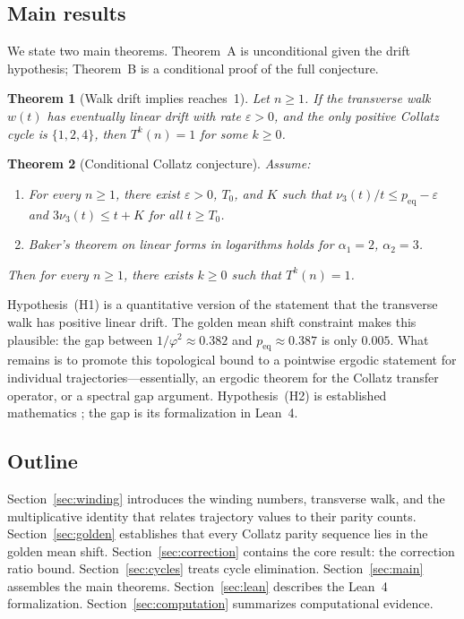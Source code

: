 \documentclass[manuscript]{aomart}
\theoremstyle{plain}
\newtheorem{theoremA}{Theorem}
\theoremstyle{definition}
\theoremstyle{remark}
\numberwithin{equation}{section}
\begin{document}
\subsection{Main results}

We state two main theorems.  Theorem~A is unconditional given the
drift hypothesis; Theorem~B is a conditional proof of the full
conjecture.

\begin{theoremA}[Walk drift implies reaches~1]\label{thm:A}
Let $n \ge 1$.  If the transverse walk $w(t)$ has eventually linear
drift with rate $\varepsilon > 0$, and the only positive Collatz
cycle is $\{1, 2, 4\}$, then $T^k(n) = 1$ for some $k \ge 0$.
\end{theoremA}

\begin{theoremA}[Conditional Collatz conjecture]\label{thm:B}
Assume:
\begin{enumerate}
  \item[\textup{(H1)}] For every $n \ge 1$, there exist
    $\varepsilon > 0$, $T_0$, and $K$ such that
    $\nu_3(t)/t \le p_{\mathrm{eq}} - \varepsilon$ and
    $3\nu_3(t) \le t + K$ for all $t \ge T_0$.
  \item[\textup{(H2)}] Baker's theorem on linear forms in logarithms
    holds for $\alpha_1 = 2$, $\alpha_2 = 3$.
\end{enumerate}
Then for every $n \ge 1$, there exists $k \ge 0$ such that
$T^k(n) = 1$.
\end{theoremA}

Hypothesis~(H1) is a quantitative version of the statement that the
transverse walk has positive linear drift.  The golden mean shift
constraint makes this plausible: the gap between
$1/\varphi^2 \approx 0.382$ and $p_{\mathrm{eq}} \approx 0.387$ is
only $0.005$.  What remains is to promote this topological bound to a
pointwise ergodic statement for individual trajectories---essentially,
an ergodic theorem for the Collatz transfer operator, or a spectral
gap argument.  Hypothesis~(H2) is established mathematics
\cite{Baker1975}; the gap is its formalization in Lean~4.

\subsection{Outline}

Section~\ref{sec:winding} introduces the winding numbers, transverse
walk, and the multiplicative identity that relates trajectory values
to their parity counts.  Section~\ref{sec:golden} establishes that
every Collatz parity sequence lies in the golden mean shift.
Section~\ref{sec:correction} contains the core result: the correction
ratio bound.  Section~\ref{sec:cycles} treats cycle elimination.
Section~\ref{sec:main} assembles the main theorems.
Section~\ref{sec:lean} describes the Lean~4 formalization.
Section~\ref{sec:computation} summarizes computational evidence.
\end{document}
